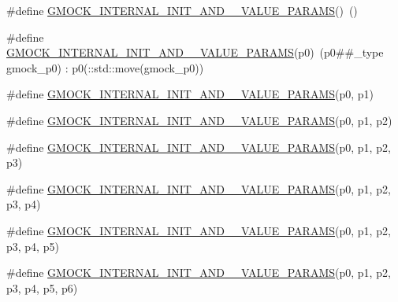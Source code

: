 \begin{DoxyCompactItemize}
\item 
\#define \mbox{\hyperlink{_obj__test_2lib_2googletest-master_2googlemock_2include_2gmock_2gmock-generated-actions_8h_aea5ee581daf40874ee7777e3c2b6d4ff}{G\+M\+O\+C\+K\+\_\+\+I\+N\+T\+E\+R\+N\+A\+L\+\_\+\+I\+N\+I\+T\+\_\+\+A\+N\+D\+\_\+\_\+\+V\+A\+L\+U\+E\+\_\+\+P\+A\+R\+A\+MS}}()~()
\item 
\#define \mbox{\hyperlink{_obj__test_2lib_2googletest-master_2googlemock_2include_2gmock_2gmock-generated-actions_8h_ad9d6ae16782bf5b8ffa096356f20b5ef}{G\+M\+O\+C\+K\+\_\+\+I\+N\+T\+E\+R\+N\+A\+L\+\_\+\+I\+N\+I\+T\+\_\+\+A\+N\+D\+\_\+\_\+\+V\+A\+L\+U\+E\+\_\+\+P\+A\+R\+A\+MS}}(p0)~(p0\#\#\+\_\+type gmock\+\_\+p0) \+: p0(\+::std\+::move(gmock\+\_\+p0))
\item 
\#define \mbox{\hyperlink{_obj__test_2lib_2googletest-master_2googlemock_2include_2gmock_2gmock-generated-actions_8h_af8fc781d28282b09de4b5bda9563cded}{G\+M\+O\+C\+K\+\_\+\+I\+N\+T\+E\+R\+N\+A\+L\+\_\+\+I\+N\+I\+T\+\_\+\+A\+N\+D\+\_\+\_\+\+V\+A\+L\+U\+E\+\_\+\+P\+A\+R\+A\+MS}}(p0,  p1)
\item 
\#define \mbox{\hyperlink{_obj__test_2lib_2googletest-master_2googlemock_2include_2gmock_2gmock-generated-actions_8h_ab452cc97981b64f68df83aedc023a201}{G\+M\+O\+C\+K\+\_\+\+I\+N\+T\+E\+R\+N\+A\+L\+\_\+\+I\+N\+I\+T\+\_\+\+A\+N\+D\+\_\+\_\+\+V\+A\+L\+U\+E\+\_\+\+P\+A\+R\+A\+MS}}(p0,  p1,  p2)
\item 
\#define \mbox{\hyperlink{_obj__test_2lib_2googletest-master_2googlemock_2include_2gmock_2gmock-generated-actions_8h_a9749c8366b3617ee3d14f4f4e9ae18ae}{G\+M\+O\+C\+K\+\_\+\+I\+N\+T\+E\+R\+N\+A\+L\+\_\+\+I\+N\+I\+T\+\_\+\+A\+N\+D\+\_\+\_\+\+V\+A\+L\+U\+E\+\_\+\+P\+A\+R\+A\+MS}}(p0,  p1,  p2,  p3)
\item 
\#define \mbox{\hyperlink{_obj__test_2lib_2googletest-master_2googlemock_2include_2gmock_2gmock-generated-actions_8h_ab3c77cabbb94ae2e3a4f9fdbda784731}{G\+M\+O\+C\+K\+\_\+\+I\+N\+T\+E\+R\+N\+A\+L\+\_\+\+I\+N\+I\+T\+\_\+\+A\+N\+D\+\_\+\_\+\+V\+A\+L\+U\+E\+\_\+\+P\+A\+R\+A\+MS}}(p0,  p1,  p2,  p3,  p4)
\item 
\#define \mbox{\hyperlink{_obj__test_2lib_2googletest-master_2googlemock_2include_2gmock_2gmock-generated-actions_8h_aef68add35463c75130872b22d07c43ff}{G\+M\+O\+C\+K\+\_\+\+I\+N\+T\+E\+R\+N\+A\+L\+\_\+\+I\+N\+I\+T\+\_\+\+A\+N\+D\+\_\+\_\+\+V\+A\+L\+U\+E\+\_\+\+P\+A\+R\+A\+MS}}(p0,  p1,  p2,  p3,  p4,  p5)
\item 
\#define \mbox{\hyperlink{_obj__test_2lib_2googletest-master_2googlemock_2include_2gmock_2gmock-generated-actions_8h_aa1ba027eec9b36d5e710bfe9da99d443}{G\+M\+O\+C\+K\+\_\+\+I\+N\+T\+E\+R\+N\+A\+L\+\_\+\+I\+N\+I\+T\+\_\+\+A\+N\+D\+\_\+\_\+\+V\+A\+L\+U\+E\+\_\+\+P\+A\+R\+A\+MS}}(p0,  p1,  p2,  p3,  p4,  p5,  p6)

\end{DoxyCompactItemize}
